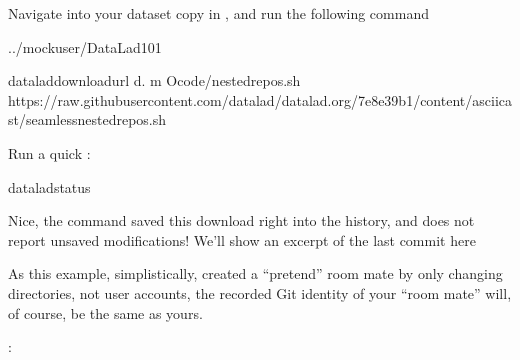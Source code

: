 \sphinxAtStartPar
Navigate into your dataset copy in ,
and run the following command

\begin{sphinxVerbatim}[commandchars=\\\{\}]
../mock\PYGZus{}user/DataLad\PYGZhy{}101

dataladdownload\PYGZhy{}url
\PYGZhy{}d.
\PYGZhy{}m
\PYGZhy{}Ocode/nested\PYGZus{}repos.sh
https://raw.githubusercontent.com/datalad/datalad.org/7e8e39b1/content/asciicast/seamless\PYGZus{}nested\PYGZus{}repos.sh
\end{sphinxVerbatim}

\sphinxAtStartPar
Run a quick :

\begin{sphinxVerbatim}[commandchars=\\\{\}]
dataladstatus
\end{sphinxVerbatim}

\sphinxAtStartPar
Nice, the  command saved this download
right into the history, and  does not report
unsaved modifications! We’ll show an excerpt of the last commit
here%
\begin{footnote}\sphinxAtStartFootnote
As this example, simplistically, created a “pretend” room mate by only changing directories, not user accounts, the recorded Git identity of your “room mate” will, of course, be the same as yours.
%
\end{footnote}:

